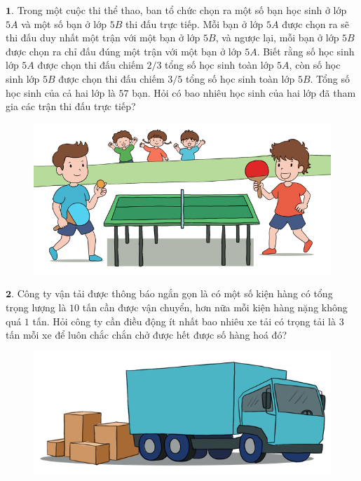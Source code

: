 \begin{multicols}{2}
	$\pmb{1.}$	Trong một cuộc thi thể thao, ban tổ chức chọn ra một số bạn học sinh ở lớp $5A$ và một số bạn ở lớp $5B$ thi đấu trực tiếp. Mỗi bạn ở lớp $5A$ được chọn ra sẽ thi đấu duy nhất một trận với một bạn ở lớp $5B$, và ngược lại, mỗi bạn ở lớp $5B$ được chọn ra chỉ đấu đúng một trận với một bạn ở lớp $5A$. Biết rằng số học sinh lớp $5A$ được chọn thi đấu chiếm $2/3$ tổng số học sinh toàn lớp $5A$, còn số học sinh lớp $5B$ được chọn thi đấu chiếm $3/5$ tổng số học sinh toàn lớp $5B$. Tổng số học sinh của cả hai lớp là $57$ bạn. Hỏi có bao nhiêu học sinh của hai lớp đã tham gia các trận thi đấu trực tiếp?
	\begin{figure}[H]
			\centering
			\vspace*{-5pt}
			\captionsetup{labelformat= empty, justification=centering}
			\includegraphics[width=1\linewidth]{Pi5_bai1}
			\vspace*{-15pt}
		\end{figure}
	$\pmb{2.}$ Công ty vận tải được thông báo ngắn gọn là có một số kiện hàng có tổng trọng lượng là $10$ tấn cần được vận chuyển, hơn nữa mỗi kiện hàng nặng không quá $1$ tấn. Hỏi công ty  cần điều động ít nhất bao nhiêu xe tải có trọng tải là $3$ tấn mỗi xe để luôn chắc chắn chở được hết được số hàng hoá đó?
	\begin{figure}[H]
			\centering
			\vspace*{-10pt}
			\captionsetup{labelformat= empty, justification=centering}
			\includegraphics[width=1\linewidth]{Pi5_bai2}

\end{figure}
\end{multicols}
